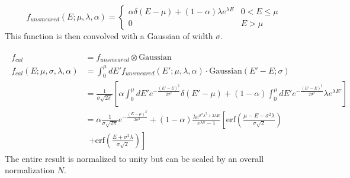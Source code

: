 \begin{equation}
    f_{unsmeared}(E;\mu,\lambda,\alpha) =
    \begin{cases}
        \alpha\delta(E-\mu) + (1-\alpha)\lambda e^{\lambda E}
        & 0 < E \leq \mu \\
        0 & E > \mu
    \end{cases}
\end{equation}
This function is then convolved with a Gaussian
of width $\sigma$.

\begin{align}
    \begin{split}
    f_{cal}    &= f_{unsmeared} \otimes \text{Gaussian} \\
    f_{cal}(E;\mu,\sigma,\lambda,\alpha) &= \int_0^\mu dE'
    f_{unsmeared}(E';\mu,\lambda,\alpha) \cdot \text{Gaussian}(E'-E; \sigma) \\
               &= \frac{1}{\sigma\sqrt{2\pi}}
               \left[
                   \alpha\int_0^\mu dE' e^{-\frac{(E'-E)^2}{2\sigma^2}} \delta(E'-\mu)
                   + (1-\alpha)\int_0^\mu dE' e^{-\frac{(E'-E)^2}{2\sigma^2}}
                   \lambda e^{\lambda E'}
               \right] \\
               &= \alpha\frac{1}{\sigma\sqrt{2\pi}}e^{-\frac{(E-\mu)^2}{2\sigma^2}}
               + (1-\alpha)
               \frac{\lambda e^{\sigma^2\lambda^2+2\lambda E}}{e^{\lambda\mu}-1}
               \left[
                   \text{erf}
                   \left(
                       \frac{\mu-E-\sigma^2\lambda}{\sigma\sqrt{2}}
                   \right)
                   \right. \\
               &\ \ \left.
                   + \text{erf}
                   \left(
                       \frac{E + \sigma^2\lambda}{\sigma\sqrt{2}}
                   \right)
               \right]
    \end{split}
\end{align}
The entire result is normalized to unity
but can be scaled by an overall normalization $N$.


